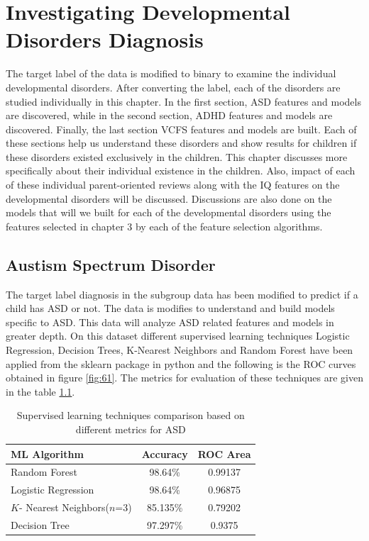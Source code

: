 \chapter{Investigating Developmental Disorders Diagnosis}
The target label of the data is modified to binary to examine the individual developmental disorders. After converting the label, each of the disorders are studied individually in this chapter. In the first section, ASD features and models are discovered, while in the second section, ADHD features and models are discovered. Finally, the last section VCFS features and models are built. Each of these sections help us understand these disorders and show results for children if these disorders existed exclusively in the children. This chapter discusses more specifically about their individual existence in the children. Also, impact of each of these individual parent-oriented reviews along with the IQ features on the developmental disorders will be discussed. Discussions are also done on the models that will we built for each of the developmental disorders using the features selected in chapter 3 by each of the feature selection algorithms.

\section{Austism Spectrum Disorder}
The target label diagnosis in the subgroup data has been modified to predict if a child has ASD or not. The data is modifies to understand and build models specific to ASD. This data will analyze ASD related features and models in greater depth. On this dataset different supervised learning techniques Logistic Regression, Decision Trees, K-Nearest Neighbors and Random Forest have been applied from the sklearn package in python and the following is the ROC curves obtained in figure \ref{fig:61}. The metrics for evaluation of these techniques are given in the table \ref{table:61}.
\begin{table}[t]
\begin{center}
\begin{tabular}{|l|c|c|}
\hline
\textbf{ML Algorithm} & \textbf{Accuracy}&	\textbf{ROC Area}\\
\hline \hline
Random Forest&	98.64\%&	0.99137\\
\hline
Logistic Regression&	98.64\%&	0.96875\\
\hline
$K$- Nearest Neighbors($n$=3)&	85.135\%&	0.79202\\
\hline
Decision Tree&	97.297\%&	0.9375\\
\hline
\end{tabular}
\end{center}
\caption{ Supervised learning techniques comparison based on different metrics for ASD }
\label{table:61}
\end{table}

